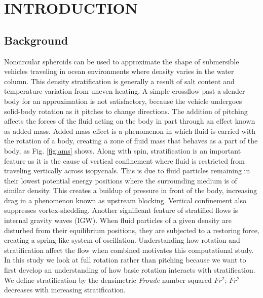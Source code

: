 %
%
%
%

\chapter{INTRODUCTION}
\thispagestyle{empty}

\section{Background}
Noncircular spheroids can be used to approximate the shape of submersible vehicles traveling in ocean environments where density varies in the water column. This density stratification is generally a result of salt content and temperature variation from uneven heating. A simple crossflow past a slender body for an approximation is not satisfactory, because the vehicle undergoes solid-body rotation as it pitches to change directions. The addition of pitching affects the forces of the fluid acting on the body in part through an effect known as added mass. Added mass effect is a phenomenon in which fluid is carried with the rotation of a body, creating a zone of fluid mass that behaves as a part of the body, as Fig. \ref{fig:ams} shows. Along with spin, stratification is an important feature as it is the cause of vertical confinement where fluid is restricted from traveling vertically across isopycnals. This is due to fluid particles remaining in their lowest potential energy positions where the surrounding medium is of similar density. This creates a buildup of pressure in front of the body, increasing drag in a phenomenon known as upstream blocking. Vertical confinement also suppresses vortex-shedding. Another significant feature of stratified flows is internal gravity waves (IGW). When fluid particles of a given density are disturbed from their equilibrium positions, they are subjected to a restoring force, creating a spring-like system of oscillation. Understanding how rotation and stratification affect the flow when combined motivates this computational study. In this study we look at full rotation rather than pitching because we want to first develop an understanding of how basic rotation interacts with stratification. We define stratification by the densimetric \textit{Froude} number squared $Fr^2$; $Fr^2$ decreases with increasing stratification.  

